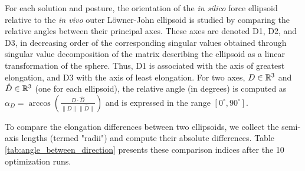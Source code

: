 For each solution and posture, the orientation of the \emph{in silico} force ellipsoid relative to the \emph{in vivo} outer Löwner-John ellipsoid is studied by comparing the relative angles between their principal axes. These axes are denoted D1, D2, and D3, in decreasing order of the corresponding singular values obtained through singular value decomposition of the matrix describing the ellipsoid as a linear transformation of the sphere. Thus, D1 is associated with the axis of greatest elongation, and D3 with the axis of least elongation. For two axes, $D\in\mathbb{R}^3$ and $\hat{D}\in\mathbb{R}^3$ (one for each ellipsoid), the relative angle (in degrees) is computed as $\alpha_D = \arccos\left(\frac{D \cdot \hat{D}}{\|D\|\|\hat{D}\|}\right)$ and is expressed in the range $[0^\circ, 90^\circ]$.

To compare the elongation differences between two ellipsoids, we collect the semi-axis lengths (termed "radii") and compute their absolute differences. Table \ref{tab:angle_between_direction} presents these comparison indices after the 10 optimization runs.

